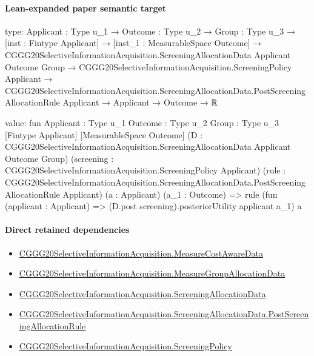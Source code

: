 \documentclass[10pt]{article}
\begin{document}
\paragraph{Lean-expanded paper semantic target}
\begin{ReviewVerbatim}
type:
{Applicant : Type u_1} →
  {Outcome : Type u_2} →
    {Group : Type u_3} →
      [inst : Fintype Applicant] →
        [inst_1 : MeasurableSpace Outcome] →
          CGGG20SelectiveInformationAcquisition.ScreeningAllocationData Applicant Outcome Group →
            CGGG20SelectiveInformationAcquisition.ScreeningPolicy Applicant →
              CGGG20SelectiveInformationAcquisition.ScreeningAllocationData.PostScreeningAllocationRule Applicant →
                Applicant → Outcome → ℝ

value:
fun {Applicant : Type u_1} {Outcome : Type u_2} {Group : Type u_3} [Fintype Applicant] [MeasurableSpace Outcome]
    (D : CGGG20SelectiveInformationAcquisition.ScreeningAllocationData Applicant Outcome Group)
    (screening : CGGG20SelectiveInformationAcquisition.ScreeningPolicy Applicant)
    (rule : CGGG20SelectiveInformationAcquisition.ScreeningAllocationData.PostScreeningAllocationRule Applicant)
    (a : Applicant) (a_1 : Outcome) =>
  rule (fun (applicant : Applicant) => (D.post screening).posteriorUtility applicant a_1) a
\end{ReviewVerbatim}

\paragraph{Direct retained dependencies}
\begin{itemize}\raggedright
\item \hyperlink{governing-declaration-254893ae2d19bfc7}{CGGG20\allowbreak{}Selective\allowbreak{}Information\allowbreak{}Acquisition.\allowbreak{}Measure\allowbreak{}Cost\allowbreak{}Aware\allowbreak{}Data}
\item \hyperlink{governing-declaration-da82fc25816f69f3}{CGGG20\allowbreak{}Selective\allowbreak{}Information\allowbreak{}Acquisition.\allowbreak{}Measure\allowbreak{}Group\allowbreak{}Allocation\allowbreak{}Data}
\item \hyperlink{paper-prerequisite-f3c5f56c4a8e4ac3}{CGGG20\allowbreak{}Selective\allowbreak{}Information\allowbreak{}Acquisition.\allowbreak{}Screening\allowbreak{}Allocation\allowbreak{}Data}
\item \hyperlink{governing-declaration-f9eddc2e17b937ab}{CGGG20\allowbreak{}Selective\allowbreak{}Information\allowbreak{}Acquisition.\allowbreak{}Screening\allowbreak{}Allocation\allowbreak{}Data.\allowbreak{}Post\allowbreak{}Screening\allowbreak{}Allocation\allowbreak{}Rule}
\item \hyperlink{paper-prerequisite-88f67c493873ffe9}{CGGG20\allowbreak{}Selective\allowbreak{}Information\allowbreak{}Acquisition.\allowbreak{}Screening\allowbreak{}Policy}
\end{itemize}
\end{document}
